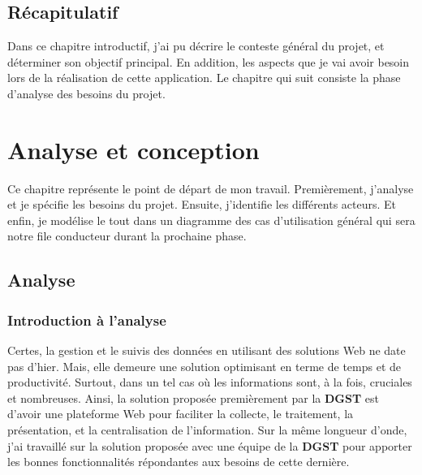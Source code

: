 \documentclass[a4paper]{report}
\begin{document}
\begin{doublespace}
    \section{Récapitulatif}
    Dans ce chapitre introductif, j'ai pu décrire le conteste général du
    projet, et
    déterminer son objectif principal. En addition, les aspects que je vai
    avoir besoin lors de la réalisation de cette application.
    Le chapitre qui suit consiste la phase d'analyse des besoins du projet.
    \newpage
    \chapter{Analyse et conception}
    \renewcommand{\headrulewidth}{1pt}
    \fancyhead[L]{\hspace*{5cm}}
    \begin{doublespace}
        Ce chapitre représente le point de départ de mon travail. Premièrement,
        j'analyse et
        je spécifie les besoins du projet. Ensuite, j'identifie les différents
        acteurs. Et enfin, je
        modélise le tout dans un diagramme des cas d’utilisation général qui
        sera notre file conducteur
        durant la prochaine phase.
        \section{Analyse}
        \subsection{Introduction à l'analyse}
        Certes, la gestion et le suivis des données en utilisant des solutions
        Web ne date pas d'hier. Mais,
        elle demeure une solution optimisant en terme de temps et de
        productivité. Surtout,
        dans un tel cas où les informations sont, à la fois, cruciales et
        nombreuses. Ainsi, la solution proposée premièrement par la \textbf{DGST} est
        d'avoir une plateforme Web pour faciliter la collecte,
        le traitement, la présentation, et la centralisation de l'information.
        Sur la même longueur d'onde, j'ai
        travaillé sur la solution proposée avec une équipe de la \textbf{DGST}
        pour apporter les bonnes
        fonctionnalités répondantes aux besoins de cette dernière.

\end{doublespace}
\end{doublespace}
\end{document}
